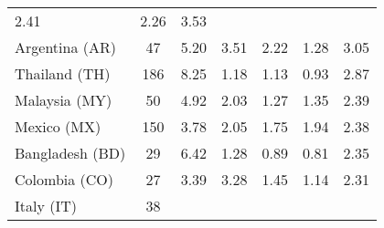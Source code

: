 \begin{table}[t]
{\begin{tabular}{lcccccc}
    \color[HTML]{000000} \color{black} 2.41 & {\cellcolor[HTML]{F7FBFF}}
    \color[HTML]{000000} \color{black} 2.26 & \color{black} 3.53 \\
    Argentina (AR) & \color{black} 47 & {\cellcolor[HTML]{6CAED6}}
    \color[HTML]{F1F1F1} \color{black} 5.20 & {\cellcolor[HTML]{BCD7EB}}
    \color[HTML]{000000} \color{black} 3.51 & {\cellcolor[HTML]{DFECF7}}
    \color[HTML]{000000} \color{black} 2.22 & {\cellcolor[HTML]{F7FBFF}}
    \color[HTML]{000000} \color{black} 1.28 & \color{black} 3.05 \\
    Thailand (TH) & \color{black} 186 & {\cellcolor[HTML]{6AAED6}}
    \color[HTML]{F1F1F1} \color{black} 8.25 & {\cellcolor[HTML]{F4F9FE}}
    \color[HTML]{000000} \color{black} 1.18 & {\cellcolor[HTML]{F5F9FE}}
    \color[HTML]{000000} \color{black} 1.13 & {\cellcolor[HTML]{F7FBFF}}
    \color[HTML]{000000} \color{black} 0.93 & \color{black} 2.87 \\
    \midrule
    Malaysia (MY) & \color{black} 50 & {\cellcolor[HTML]{6AAED6}}
    \color[HTML]{F1F1F1} \color{black} 4.92 & {\cellcolor[HTML]{E3EEF8}}
    \color[HTML]{000000} \color{black} 2.03 & {\cellcolor[HTML]{F7FBFF}}
    \color[HTML]{000000} \color{black} 1.27 & {\cellcolor[HTML]{F5FAFE}}
    \color[HTML]{000000} \color{black} 1.35 & \color{black} 2.39 \\
    Mexico (MX) & \color{black} 150 & {\cellcolor[HTML]{6AAED6}}
    \color[HTML]{F1F1F1} \color{black} 3.78 & {\cellcolor[HTML]{E9F2FA}}
    \color[HTML]{000000} \color{black} 2.05 & {\cellcolor[HTML]{F7FBFF}}
    \color[HTML]{000000} \color{black} 1.75 & {\cellcolor[HTML]{EEF5FC}}
    \color[HTML]{000000} \color{black} 1.94 & \color{black} 2.38 \\
    Bangladesh (BD) & \color{black} 29 & {\cellcolor[HTML]{6AAED6}}
    \color[HTML]{F1F1F1} \color{black} 6.42 & {\cellcolor[HTML]{EFF6FC}}
    \color[HTML]{000000} \color{black} 1.28 & {\cellcolor[HTML]{F6FAFF}}
    \color[HTML]{000000} \color{black} 0.89 & {\cellcolor[HTML]{F7FBFF}}
    \color[HTML]{000000} \color{black} 0.81 & \color{black} 2.35 \\
    Colombia (CO) & \color{black} 27 & {\cellcolor[HTML]{6AAED6}}
    \color[HTML]{F1F1F1} \color{black} 3.39 & {\cellcolor[HTML]{75B4D8}}
    \color[HTML]{000000} \color{black} 3.28 & {\cellcolor[HTML]{EAF2FB}}
    \color[HTML]{000000} \color{black} 1.45 & {\cellcolor[HTML]{F7FBFF}}
    \color[HTML]{000000} \color{black} 1.14 & \color{black} 2.31 \\
    Italy (IT) & \color{black} 38 & {\cellcolor[HTML]{B7D4EA}}

\end{tabular}}
\end{table}
